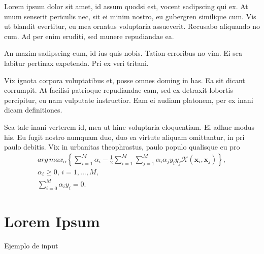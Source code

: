 Lorem ipsum dolor sit amet, id assum quodsi est, vocent sadipscing qui ex. At unum senserit periculis nec, sit ei minim nostro, eu gubergren similique cum. Vis ut blandit evertitur, eu mea ornatus voluptaria assueverit. Recusabo aliquando no cum. Ad per enim eruditi, sed munere repudiandae ea.

An mazim sadipscing cum, id ius quis nobis. Tation erroribus no vim. Ei sea labitur pertinax expetenda. Pri ex veri tritani.

Vix ignota corpora voluptatibus et, posse omnes doming in has. Ea sit dicant corrumpit. At facilisi patrioque repudiandae eam, sed ex detraxit lobortis percipitur, eu nam vulputate instructior. Eam ei audiam platonem, per ex inani dicam definitiones.

Sea tale inani verterem id, mea ut hinc voluptaria eloquentiam. Ei adhuc modus his. Eu fugit nostro numquam duo, duo ea virtute aliquam omittantur, in pri paulo debitis. Vix in urbanitas theophrastus, paulo populo qualisque cu pro~\cite{Ahangi2012,Akram2014,Akram2015}
\begin{eqnarray}
  arg\, max_\alpha\left\{ \sum_{i=1}^M \alpha_i - \frac{1}{2} \sum_{i=1}^M\sum_{j=1}^M \alpha_i\alpha_j y_i y_j \mathcal{K}(\textbf{x}_i,\textbf{x}_j)\right\},\label{ec:svmdual}\\
  \alpha_i \geq 0,\, i=1,...,M, \nonumber\\
  \sum_{i=0}^M \alpha_i y_i=0. \nonumber
\end{eqnarray}

\section{Lorem Ipsum}
Ejemplo de input\\
  